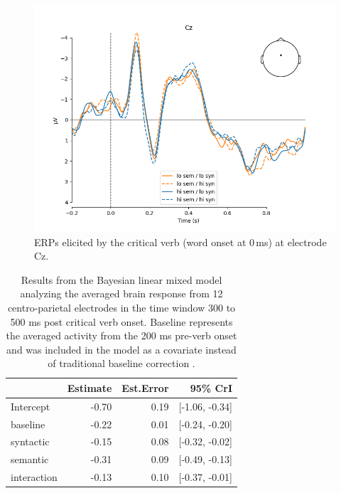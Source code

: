 \documentclass[a4paper, man, floatsintext]{apa7}
\begin{document}
\begin{figure}[H]
    \caption{ERPs elicited by the critical verb (word onset at 0\,ms) at electrode Cz.}
    \label{fig:erp_all}
    \centering
    \includegraphics[width=\textwidth]{images/N_103_Cz_crit.png}
\end{figure}

\begin{table}[H]
    \caption{Results from the Bayesian linear mixed model analyzing the averaged brain response from 12 centro-parietal electrodes in the time window 300 to 500 ms post critical verb onset. Baseline represents the averaged activity from the 200 ms pre-verb onset and was included in the model as a covariate instead of traditional baseline correction \citep[see][]{alday2019}.}
    \label{tab:eeg_mod}
    \centering
    \begin{tabular}{lrrr}
    \toprule
    & Estimate & Est.Error & 95\% CrI  \\
    \midrule
Intercept &  -0.70 & 0.19 &  [-1.06, -0.34] \\
baseline  &  -0.22 & 0.01 &  [-0.24, -0.20] \\
syntactic &  -0.15 & 0.08 &  [-0.32, -0.02] \\
semantic  &  -0.31 & 0.09 &  [-0.49, -0.13] \\
interaction& -0.13 & 0.10 &  [-0.37, -0.01] \\
    \bottomrule
    \end{tabular}
\end{table}
\end{document}
